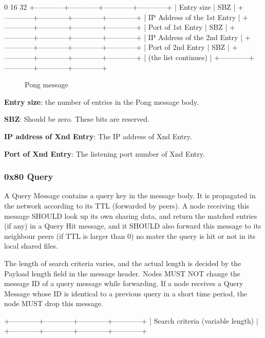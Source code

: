 \documentclass[12pt, a4paper]{article}
\begin{document}
\begin{verbbox}
0                          16                        32
+------------+------------+------------+------------+
|        Entry size       |           SBZ           |
+------------+------------+------------+------------+
|               IP Address of the 1st Entry         |
+------------+------------+------------+------------+
|   Port of 1st Entry     |    	      SBZ           |
+------------+------------+------------+------------+
|               IP Address of the 2nd Entry         |
+------------+------------+------------+------------+
|   Port of 2nd Entry     |    	      SBZ           |
+------------+------------+------------+------------+
|   (the list continues)                            |
+------------+------------+------------+------------+
\end{verbbox}

\begin{figure}[h!]
  \centering
  \theverbbox
  \label{header}
  \caption{Pong message}
\end{figure}

\textbf{Entry size}: the number of entries in the Pong message body.

\textbf{SBZ}: Should be zero. These bits are reserved.

\textbf{IP address of Xnd Entry}: The IP address of Xnd Entry.

\textbf{Port of Xnd Entry}: The listening port number of Xnd Entry.

\subsubsection{0x80 Query}
A Query Message contains a query key in the message body.
It is propagated in the network according to its TTL (forwarded by peers).
A node receiving this message SHOULD look up its own sharing data, and return the matched entries (if any) in a Query Hit message, and it SHOULD also forward this message to its neighbour peers (if TTL is larger than 0) no mater the query is hit or not in its local shared files.

The length of search criteria varies, and the actual length is decided by the Payload length field in the message header.
Nodes MUST NOT change the message ID of a query message while forwarding.
If a node receives a Query Message whose ID is identical to a previous query in a short time period, the node MUST drop this message.

\begin{verbbox}
+------------+------------+------------+------------+
|     Search criteria (variable length)             |
+------------+------------+------------+------------+
\end{verbbox}
\end{document}
